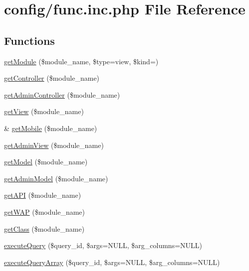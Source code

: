 \hypertarget{func_8inc_8php}{}\section{config/func.inc.\+php File Reference}
\label{func_8inc_8php}
\subsection*{Functions}
\begin{DoxyCompactItemize}
\item 
\hyperlink{func_8inc_8php_a3b6c165fdbe9c9e9ef3beea18a894349}{get\+Module} (\$module\+\_\+name, \$type=\textquotesingle{}view\textquotesingle{}, \$kind=\textquotesingle{}\textquotesingle{})
\item 
\hyperlink{func_8inc_8php_aa08f01e3bf130d770b373ca8493e3e9b}{get\+Controller} (\$module\+\_\+name)
\item 
\hyperlink{func_8inc_8php_a2f7ca88a5226536aca3b2f5682bd7b2d}{get\+Admin\+Controller} (\$module\+\_\+name)
\item 
\hyperlink{func_8inc_8php_a49d537fc2c7b51ab5d7b7c6672b21ce3}{get\+View} (\$module\+\_\+name)
\item 
\& \hyperlink{func_8inc_8php_a26d3f423593da53eb90bb738aeed23ea}{get\+Mobile} (\$module\+\_\+name)
\item 
\hyperlink{func_8inc_8php_a194629ccc05f325c64834925b05d0941}{get\+Admin\+View} (\$module\+\_\+name)
\item 
\hyperlink{func_8inc_8php_aecdfcc5332bcf22df01fc21a03b64435}{get\+Model} (\$module\+\_\+name)
\item 
\hyperlink{func_8inc_8php_a902cd0c884e75afab2682fdd3ae3791f}{get\+Admin\+Model} (\$module\+\_\+name)
\item 
\hyperlink{func_8inc_8php_a12c822fc3e002eb1c58c58001db7ac88}{get\+A\+PI} (\$module\+\_\+name)
\item 
\hyperlink{func_8inc_8php_a0d8de97888953b480d02a9c9d845a64c}{get\+W\+AP} (\$module\+\_\+name)
\item 
\hyperlink{func_8inc_8php_a1d90f6abc9ca2d1a4500071159ebd4e7}{get\+Class} (\$module\+\_\+name)
\item 
\hyperlink{func_8inc_8php_a418bc23855eebc0d90190dd625ac4474}{execute\+Query} (\$query\+\_\+id, \$args=N\+U\+LL, \$arg\+\_\+columns=N\+U\+LL)
\item 
\hyperlink{func_8inc_8php_ace5cc06ee6c5d655a1bdcc15846a779e}{execute\+Query\+Array} (\$query\+\_\+id, \$args=N\+U\+LL, \$arg\+\_\+columns=N\+U\+LL)

\end{DoxyCompactItemize}
